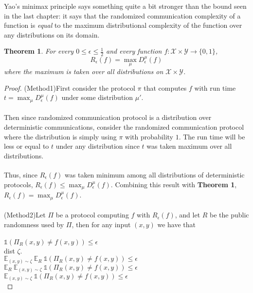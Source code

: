 \documentclass[11pt,oneside]{book}
\theoremstyle{plain}
\newtheorem{theorem}{Theorem}
\theoremstyle{definition}
\theoremstyle{plain}
\newcommand{\calX}{\mathcal{X}}
\newcommand{\calY}{\mathcal{Y}}
\begin{document}
Yao's minimax principle says something quite a bit stronger than the bound seen in the last chapter: it says that the randomized communication complexity of a function is \emph{equal} to the maximum distributional complexity of the function over any distributions on its domain.

\begin{theorem}
	For every $0 \le \epsilon \le \frac12$ and every function $f : \calX \times \calY \to \{0,1\}$, 
	\[
	R_\epsilon(f) = \max_{\mu} D_\epsilon^\mu(f)
	\]
	where the maximum is taken over all distributions on $\calX \times \calY$.
\end{theorem}

\begin{proof}
	(Method1)First consider the protocol $\pi$ that computes $f$ with run time $t=\max_{\mu} D_\epsilon^\mu(f)$ under some distribution $\mu'$. \\
	\\
	Then since randomized communication protocol is a distribution over deterministic communications, consider the randomized communication protocol where the distribution is simply using $\pi$ with probability $1$. The run time will be less or equal to $t$ under any distribution since $t$ was taken maximum over all distributions. \\
	\\
	Thus, since $R_\epsilon(f)$ was taken minimum among all distributions of deterministic protocols, $R_\epsilon(f) 
	\leq \max_{\mu} D_\epsilon^\mu(f)$. Combining this result with \textbf{Theorem 1}, $R_\epsilon(f) = \max_{\mu} D_\epsilon^\mu(f)$.\\
	 \\
	(Method2)Let $\Pi$ be a protocol computing $f$ with $R_\epsilon(f)$, and let $R$ be the public randomness used by $\Pi$, then for any input $(x,y)$ we have that \\
	 \\ 
	$\mathds{1}(\Pi_R(x,y)\neq f(x,y))\leq \epsilon$\\
	dist $\zeta$.\\
    $\mathbb{E}_{(x,y)\sim \zeta}\ \mathbb{E}_R\ \mathds{1}(\Pi_R(x,y)\neq f(x,y))\leq \epsilon$\\
    $\mathbb{E}_R\ \mathbb{E}_{(x,y)\sim \zeta}\  \mathds{1}(\Pi_R(x,y)\neq f(x,y))\leq \epsilon$\\
    $\mathbb{E}_{(x,y)\sim \zeta}\  \mathds{1}(\Pi_R(x,y)\neq f(x,y))\leq \epsilon$\\
\end{proof}
\end{document}
